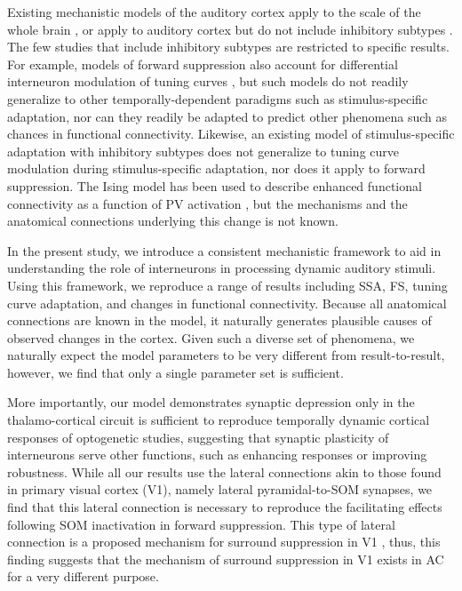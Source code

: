 \documentclass[a4paper,10pt]{article}
\begin{document}
Existing mechanistic models of the auditory cortex apply to the scale of the whole brain  \cite{jansen1995electroencephalogram,wang2013realistic}, or apply to auditory cortex but do not include inhibitory subtypes \cite{mill2011neurocomputational,loebel2007processing,yarden2017stimulus}. The few studies that include inhibitory subtypes are restricted to specific results. For example, models of forward suppression \cite{phillips2017cortical,phillips2017diverse} also account for differential interneuron modulation of tuning curves \cite{phillips2016asymmetric,seybold2015inhibitory}, but such models do not readily generalize to other temporally-dependent paradigms such as stimulus-specific adaptation, nor can they readily be adapted to predict other phenomena such as chances in functional connectivity. Likewise, an existing model of stimulus-specific adaptation with inhibitory subtypes \cite{natan2015complementary} does not generalize to tuning curve modulation during stimulus-specific adaptation, nor does it apply to forward suppression. The Ising model has been used to describe enhanced functional connectivity as a function of PV activation \cite{hamilton2013optogenetic}, but the mechanisms and the anatomical connections underlying this change is not known.

In the present study, we introduce a consistent mechanistic framework to aid in understanding the role of interneurons in processing dynamic auditory stimuli. Using this framework, we reproduce a range of results including SSA, FS, tuning curve adaptation, and changes in functional connectivity. Because all anatomical connections are known in the model, it naturally generates plausible causes of observed changes in the cortex. Given such a diverse set of phenomena, we naturally expect the model parameters to be very different from result-to-result, however, we find that only a single parameter set is sufficient.

More importantly, our model demonstrates synaptic depression only in the thalamo-cortical circuit is sufficient to reproduce temporally dynamic cortical responses of optogenetic studies, suggesting that synaptic plasticity of interneurons serve other functions, such as enhancing responses or improving robustness. While all our results use the lateral connections akin to those found in primary visual cortex (V1), namely lateral pyramidal-to-SOM synapses, we find that this lateral connection is necessary to reproduce the facilitating effects following SOM inactivation in forward suppression. This type of lateral connection is a proposed mechanism for surround suppression in V1 \cite{}, thus, this finding suggests that the mechanism of surround suppression in V1 exists in AC for a very different purpose.
\end{document}
